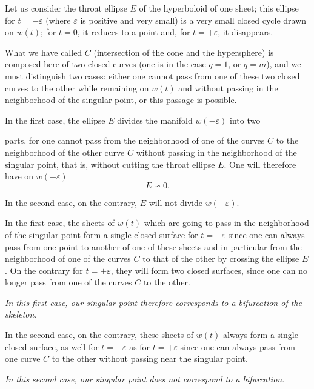 \documentclass{article}
\begin{document}
Let us consider the throat ellipse $E$ of the hyperboloid of one sheet; this ellipse for $t = -\varepsilon$ (where $\varepsilon$ is positive and very small) is a very small closed cycle drawn on $w(t)$; for $t = 0$, it reduces to a point and, for $t = +\varepsilon$, it disappears.

What we have called $C$ (intersection of the cone and the hypersphere) is composed here of two closed curves (one is in the case $q = 1$, or $q = m$), and we must distinguish two cases: either one cannot pass from one of these two closed curves to the other while remaining on $w(t)$ and without passing in the neighborhood of the singular point, or this passage is possible.

In the first case, the ellipse $E$ divides the manifold $w(-\varepsilon)$ into two

parts, for one cannot pass from the neighborhood of one of the curves $C$ to the neighborhood of the other curve $C$ without passing in the neighborhood of the singular point, that is, without cutting the throat ellipse $E$. One will therefore have on $w(-\varepsilon)$
\[ E \backsim 0. \]

In the second case, on the contrary, $E$ will not divide $w(-\varepsilon)$.

In the first case, the sheets of $w(t)$ which are going to pass in the neighborhood of the singular point form a single closed surface for $t = -\varepsilon$ since one can always pass from one point to another of one of these sheets and in particular from the neighborhood of one of the curves $C$ to that of the other by crossing the ellipse $E$. On the contrary for $t = +\varepsilon$, they will form two closed surfaces, since one can no longer pass from one of the curves $C$ to the other.

\emph{In this first case, our singular point therefore corresponds to a bifurcation of the skeleton}.

In the second case, on the contrary, these sheets of $w(t)$ always form a single closed surface, as well for $t = -\varepsilon$ as for $t = +\varepsilon$ since one can always pass from one curve $C$ to the other without passing near the singular point.

\emph{In this second case, our singular point does not correspond to a bifurcation}.
\end{document}
